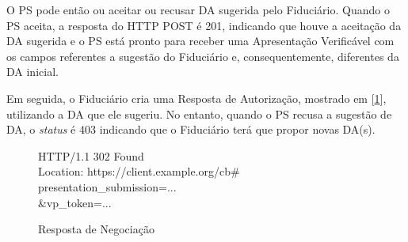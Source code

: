 O PS pode então ou aceitar ou recusar DA sugerida pelo Fiduciário. Quando o PS aceita, a resposta do HTTP POST é 201, indicando que houve a aceitação da DA sugerida e o PS está pronto para receber uma Apresentação Verificável com os campos referentes a sugestão do Fiduciário e, consequentemente, diferentes da DA inicial. 

Em seguida, o Fiduciário cria uma Resposta de Autorização, mostrado em [\ref{fig:authorization-response}], utilizando a DA que ele sugeriu. No entanto, quando o PS recusa a sugestão de DA, o \textit{status} é 403 indicando que o Fiduciário terá que propor novas DA(s). 

\begin{figure}[h]    
    {\couriernew
    HTTP/1.1 302 Found \\
    Location: https://client.example.org/cb\# \\
    presentation\_submission=... \\
    \&vp\_token=... \\
    }
  \caption{Resposta de Negociação}
  \label{fig:authorization-response}
\end{figure}